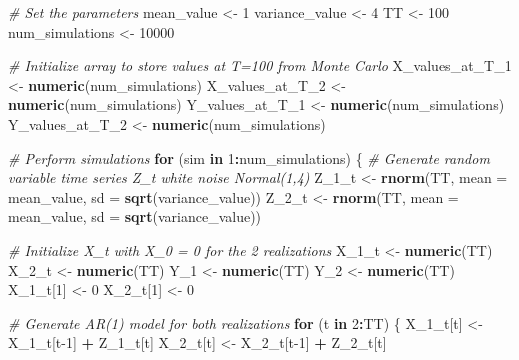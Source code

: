 \documentclass[
]{article}
\newenvironment{Shaded}{\begin{snugshade}}{\end{snugshade}}
\newcommand{\AttributeTok}[1]{\textcolor[rgb]{0.13,0.29,0.53}{#1}}
\newcommand{\CommentTok}[1]{\textcolor[rgb]{0.56,0.35,0.01}{\textit{#1}}}
\newcommand{\ControlFlowTok}[1]{\textcolor[rgb]{0.13,0.29,0.53}{\textbf{#1}}}
\newcommand{\DecValTok}[1]{\textcolor[rgb]{0.00,0.00,0.81}{#1}}
\newcommand{\FunctionTok}[1]{\textcolor[rgb]{0.13,0.29,0.53}{\textbf{#1}}}
\newcommand{\NormalTok}[1]{#1}
\newcommand{\OtherTok}[1]{\textcolor[rgb]{0.56,0.35,0.01}{#1}}
\newcommand{\SpecialCharTok}[1]{\textcolor[rgb]{0.81,0.36,0.00}{\textbf{#1}}}
\begin{document}
\begin{Shaded}
\begin{Highlighting}[]
\CommentTok{\# Set the parameters}
\NormalTok{mean\_value }\OtherTok{\textless{}{-}} \DecValTok{1}
\NormalTok{variance\_value }\OtherTok{\textless{}{-}} \DecValTok{4}
\NormalTok{TT }\OtherTok{\textless{}{-}} \DecValTok{100}
\NormalTok{num\_simulations }\OtherTok{\textless{}{-}} \DecValTok{10000}

\CommentTok{\# Initialize array to store values at T=100 from Monte Carlo}
\NormalTok{X\_values\_at\_T\_1 }\OtherTok{\textless{}{-}} \FunctionTok{numeric}\NormalTok{(num\_simulations)}
\NormalTok{X\_values\_at\_T\_2 }\OtherTok{\textless{}{-}} \FunctionTok{numeric}\NormalTok{(num\_simulations)}
\NormalTok{Y\_values\_at\_T\_1 }\OtherTok{\textless{}{-}} \FunctionTok{numeric}\NormalTok{(num\_simulations)}
\NormalTok{Y\_values\_at\_T\_2 }\OtherTok{\textless{}{-}} \FunctionTok{numeric}\NormalTok{(num\_simulations)}

\CommentTok{\# Perform simulations}
\ControlFlowTok{for}\NormalTok{ (sim }\ControlFlowTok{in} \DecValTok{1}\SpecialCharTok{:}\NormalTok{num\_simulations) \{}
  \CommentTok{\# Generate random variable time series Z\_t white noise Normal(1,4)}
\NormalTok{  Z\_1\_t }\OtherTok{\textless{}{-}} \FunctionTok{rnorm}\NormalTok{(TT, }\AttributeTok{mean =}\NormalTok{ mean\_value, }\AttributeTok{sd =} \FunctionTok{sqrt}\NormalTok{(variance\_value))}
\NormalTok{  Z\_2\_t }\OtherTok{\textless{}{-}} \FunctionTok{rnorm}\NormalTok{(TT, }\AttributeTok{mean =}\NormalTok{ mean\_value, }\AttributeTok{sd =} \FunctionTok{sqrt}\NormalTok{(variance\_value))}
  
  \CommentTok{\# Initialize X\_t with X\_0 = 0 for the 2 realizations}
\NormalTok{  X\_1\_t }\OtherTok{\textless{}{-}} \FunctionTok{numeric}\NormalTok{(TT)}
\NormalTok{  X\_2\_t }\OtherTok{\textless{}{-}} \FunctionTok{numeric}\NormalTok{(TT)}
\NormalTok{  Y\_1 }\OtherTok{\textless{}{-}} \FunctionTok{numeric}\NormalTok{(TT)}
\NormalTok{  Y\_2 }\OtherTok{\textless{}{-}} \FunctionTok{numeric}\NormalTok{(TT)}
\NormalTok{  X\_1\_t[}\DecValTok{1}\NormalTok{] }\OtherTok{\textless{}{-}} \DecValTok{0}
\NormalTok{  X\_2\_t[}\DecValTok{1}\NormalTok{] }\OtherTok{\textless{}{-}} \DecValTok{0}
  
  \CommentTok{\# Generate AR(1) model for both realizations}
  \ControlFlowTok{for}\NormalTok{ (t }\ControlFlowTok{in} \DecValTok{2}\SpecialCharTok{:}\NormalTok{TT) \{}
\NormalTok{    X\_1\_t[t] }\OtherTok{\textless{}{-}}\NormalTok{ X\_1\_t[t}\DecValTok{{-}1}\NormalTok{] }\SpecialCharTok{+}\NormalTok{ Z\_1\_t[t]}
\NormalTok{    X\_2\_t[t] }\OtherTok{\textless{}{-}}\NormalTok{ X\_2\_t[t}\DecValTok{{-}1}\NormalTok{] }\SpecialCharTok{+}\NormalTok{ Z\_2\_t[t]}
    

\end{Highlighting}
\end{Shaded}
\end{document}
